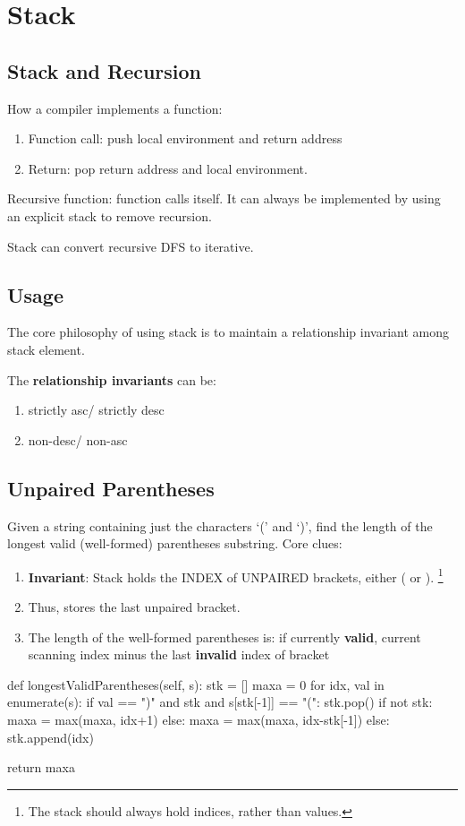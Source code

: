 \section{Stack}
\subsection{Stack and Recursion}
How a compiler implements a function:
\begin{enumerate}
\item Function call: push local environment and return address
\item Return: pop return address and local environment. 
\end{enumerate}

Recursive function: function calls itself. It can always be implemented by using an explicit stack to remove recursion. 

Stack can convert recursive DFS to iterative. 

\subsection{Usage}
The core philosophy of using stack is to maintain a relationship invariant among stack element. 

The \textbf{relationship invariants} can be:
\begin{enumerate}
\item strictly asc/ strictly desc
\item non-desc/ non-asc
\end{enumerate}

\subsection{Unpaired Parentheses}
Given a string containing just the characters `(' and `)', find the length of the longest valid (well-formed) parentheses substring. Core clues:
\begin{enumerate}
\item \textbf{Invariant}: Stack holds the INDEX of UNPAIRED brackets, either ( or ). \footnote{The stack should always hold indices, rather than values.}
\item Thus,  stores the last unpaired bracket. 
\item The length of the well-formed parentheses is: if currently \textbf{valid}, current scanning index  minus the last \textbf{invalid} index of bracket 
\end{enumerate}
\begin{python}
def longestValidParentheses(self, s):
  stk = []
  maxa = 0
  for idx, val in enumerate(s):
    if val == ")" and stk and s[stk[-1]] == "(":
      stk.pop()
      if not stk:
        maxa = max(maxa, idx+1)
      else:
        maxa = max(maxa, idx-stk[-1])
    else:
      stk.append(idx)

  return maxa

\end{python}

